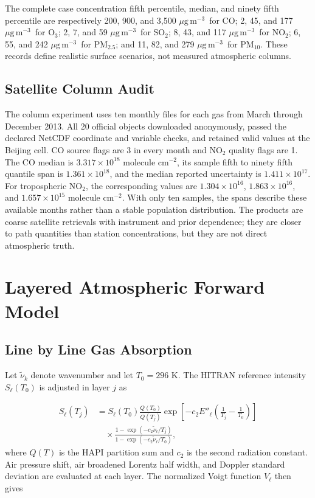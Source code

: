 \documentclass[conference]{IEEEtran}
\newcommand{\ugm}{\ensuremath{\mu\mathrm{g\,m}^{-3}}}
\newcommand{\pmfive}{PM$_{2.5}$}
\newcommand{\pmten}{PM$_{10}$}
\begin{document}
The complete case concentration fifth percentile, median, and ninety fifth percentile are respectively 200, 900, and 3,500 \ugm\ for CO; 2, 45, and 177 \ugm\ for O$_3$; 2, 7, and 59 \ugm\ for SO$_2$; 8, 43, and 117 \ugm\ for NO$_2$; 6, 55, and 242 \ugm\ for \pmfive; and 11, 82, and 279 \ugm\ for \pmten. These records define realistic surface scenarios, not measured atmospheric columns.

\subsection{Satellite Column Audit}

The column experiment uses ten monthly files for each gas from March through December 2013. All 20 official objects downloaded anonymously, passed the declared NetCDF coordinate and variable checks, and retained valid values at the Beijing cell. CO source flags are 3 in every month and NO$_2$ quality flags are 1. The CO median is $3.317\times10^{18}$ molecule cm$^{-2}$, its sample fifth to ninety fifth quantile span is $1.361\times10^{18}$, and the median reported uncertainty is $1.411\times10^{17}$. For tropospheric NO$_2$, the corresponding values are $1.304\times10^{16}$, $1.863\times10^{16}$, and $1.657\times10^{15}$ molecule cm$^{-2}$. With only ten samples, the spans describe these available months rather than a stable population distribution. The products are coarse satellite retrievals with instrument and prior dependence; they are closer to path quantities than station concentrations, but they are not direct atmospheric truth.

\section{Layered Atmospheric Forward Model}

\subsection{Line by Line Gas Absorption}

Let $\tilde{\nu}_k$ denote wavenumber and let $T_0=296$ K. The HITRAN reference intensity $S_\ell(T_0)$ is adjusted in layer $j$ as

\begin{align}
S_\ell(T_j) &= S_\ell(T_0)\frac{Q(T_0)}{Q(T_j)}
\exp\!\left[-c_2E''_\ell\left(\frac{1}{T_j}-\frac{1}{T_0}\right)\right]
\nonumber\\
&\quad \times
\frac{1-\exp(-c_2\tilde{\nu}_\ell/T_j)}
{1-\exp(-c_2\tilde{\nu}_\ell/T_0)},
\label{eq:intensity}
\end{align}
where $Q(T)$ is the HAPI partition sum and $c_2$ is the second radiation constant. Air pressure shift, air broadened Lorentz half width, and Doppler standard deviation are evaluated at each layer. The normalized Voigt function $V_\ell$ then gives
\end{document}
